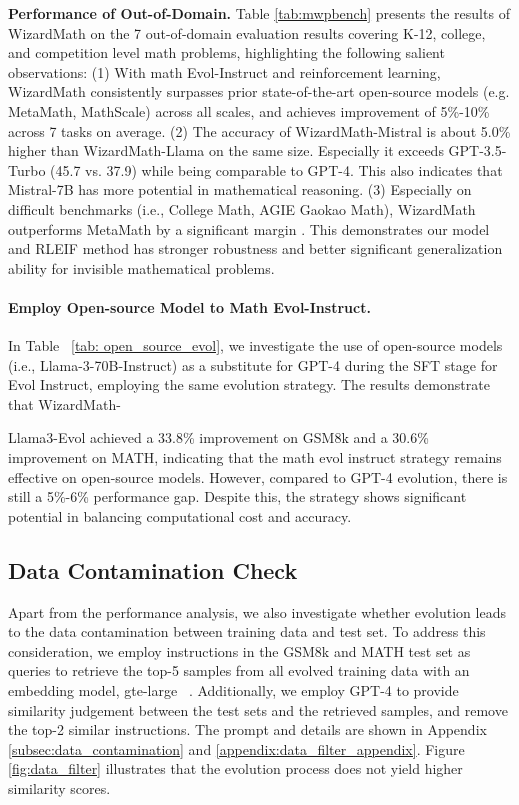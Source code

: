 \textbf{Performance of Out-of-Domain.} Table \ref{tab:mwpbench}  presents the results of WizardMath on the 7 out-of-domain evaluation results covering K-12, college, and competition level math problems, highlighting the following salient observations:  (1) With math Evol-Instruct and reinforcement learning, WizardMath consistently surpasses prior state-of-the-art open-source models (e.g. MetaMath, MathScale) across all scales, and achieves improvement of 5\%-10\% across 7 tasks on average. (2) The accuracy of WizardMath-Mistral is about 5.0\% higher than WizardMath-Llama on the same size. Especially it exceeds GPT-3.5-Turbo (45.7 vs. 37.9) while being comparable to GPT-4. This also indicates that Mistral-7B has more potential in mathematical reasoning. (3) Especially on difficult benchmarks (i.e., College Math, AGIE Gaokao Math), WizardMath outperforms MetaMath by a significant margin . This demonstrates our model and RLEIF method has stronger robustness and better significant generalization ability for invisible mathematical problems. 

\paragraph{Employ Open-source Model to Math Evol-Instruct.} In Table ~\ref{tab: open_source_evol}, we investigate the use of open-source models (i.e., Llama-3-70B-Instruct) as a substitute for GPT-4 during the SFT stage for Evol Instruct, employing the same evolution strategy. The results demonstrate that WizardMath-

Llama3-Evol achieved a 33.8\% improvement on GSM8k and a 30.6\% improvement on MATH, indicating that the math evol instruct strategy remains effective on open-source models. However, compared to GPT-4 evolution, there is still a 5\%-6\% performance gap. Despite this, the strategy shows significant potential in balancing computational cost and accuracy.

\subsection{Data Contamination Check} Apart from the performance analysis, we also investigate whether evolution leads to the data contamination between training data and test set. To address this consideration,   we employ instructions in the  GSM8k and MATH test set as queries to retrieve the top-5 samples from all evolved training data with an   embedding model, gte-large ~\citep{Li2023TowardsGT}. Additionally, we employ GPT-4  to provide similarity judgement between the test sets and the retrieved samples, and remove the top-2 similar instructions. The prompt and details are shown in Appendix \ref{subsec:data_contamination} and \ref{appendix:data_filter_appendix}. Figure \ref{fig:data_filter} illustrates that the evolution process does not yield higher similarity scores. 

